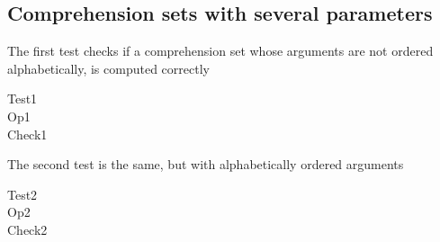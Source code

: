 \documentclass{article}
\begin{document}
\subsection*{Comprehension sets with several parameters}
The first test checks if a comprehension set whose arguments are not
ordered alphabetically, is computed correctly
\begin{zed}
  Test1 \\
  Op1 \\
  Check1 \\
\end{zed}
The second test is the same, but with alphabetically ordered arguments
\begin{zed}
  Test2 \\
  Op2 \\
  Check2 \\
\end{zed}
\end{document}
